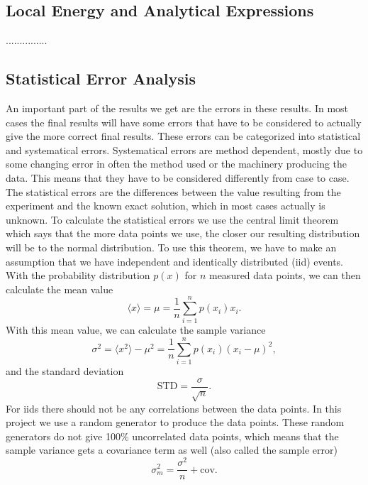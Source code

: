 \documentclass[12pt,a4paper,english]{article}
\begin{document}
\subsection{Local Energy and Analytical Expressions}
\label{subsect:E_L}
...............


\subsection{Statistical Error Analysis}
\label{subsect:Error_analysis}
An important part of the results we get are the errors in these results. In most cases the final results will have some errors that have to be considered to actually give the more correct final results. These errors can be categorized into statistical and systematical errors. Systematical errors are method dependent, mostly due to some changing error in often the method used or the machinery producing the data. This means that they have to be considered differently from case to case. The statistical errors are the differences between the value resulting from the experiment and the known exact solution, which in most cases actually is unknown. To calculate the statistical errors we use the central limit theorem which says that the more data points we use, the closer our resulting distribution will be to the normal distribution. To use this theorem, we have to make an assumption that we have independent and identically distributed (iid) events. With the probability distribution $p(x)$ for $n$ measured data points, we can then calculate the mean value
\begin{equation}
\label{eq:stat_mean}
\langle x \rangle =\mu=\frac{1}{n}\sum_{i=1}^{n}p(x_i)x_i.
\end{equation}
With this mean value, we can calculate the sample variance 
\begin{equation}
\label{eq:stat_ar}
\sigma^2=\langle x^2 \rangle-\mu^2=\frac{1}{n}\sum_{i=1}^{n}p(x_i)(x_i-\mu)^2,
\end{equation}
and the standard deviation
\begin{equation}
\label{eq:stat_STD}
\text{STD}=\frac{\sigma}{\sqrt{n}}.
\end{equation}
For iids there should not be any correlations between the data points. In this project we use a random generator to produce the data points. These random generators do not give 100\% uncorrelated data points, which means that the sample variance gets a covariance term as well (also called the sample error)
\begin{equation}
\label{eq:stat_var_cov}
\sigma_m^2=\frac{\sigma^2}{n}+\text{cov}.
\end{equation}
\end{document}
